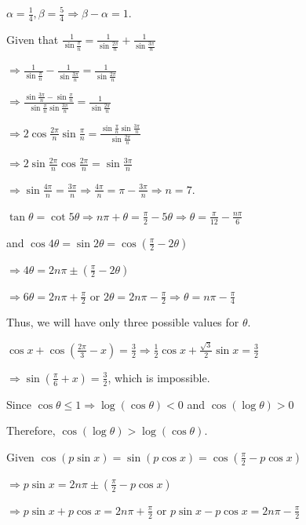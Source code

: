   $\alpha = \frac{1}{4}, \beta = \frac{5}{4}\Rightarrow \beta - \alpha = 1$.
\item Given that $\frac{1}{\sin\frac{\pi}{n}} = \frac{1}{\sin\frac{2\pi}{n}} + \frac{1}{\sin\frac{3\pi}{n}}$

  $\Rightarrow \frac{1}{\sin\frac{\pi}{n}} - \frac{1}{\sin\frac{3\pi}{n}} = \frac{1}{\sin\frac{2\pi}{n}}$

  $\Rightarrow \frac{\sin\frac{3\pi}{n} - \sin\frac{\pi}{n}}{\sin\frac{\pi}{n}\sin\frac{3\pi}{n}}
  = \frac{1}{\sin\frac{2\pi}{n}}$

  $\Rightarrow 2\cos\frac{2\pi}{n}\sin\frac{\pi}{n}
  = \frac{\sin\frac{\pi}{n}\sin\frac{3\pi}{n}}{\sin\frac{2\pi}{n}}$

  $\Rightarrow 2\sin\frac{2\pi}{n}\cos\frac{2\pi}{n} = \sin\frac{3\pi}{n}$

  $\Rightarrow \sin\frac{4\pi}{n} = \frac{3\pi}{n}\Rightarrow \frac{4\pi}{n} = \pi
  - \frac{3\pi}{n}\Rightarrow n = 7$.
\item $\tan\theta = \cot5\theta \Rightarrow n\pi + \theta = \frac{\pi}{2} - 5\theta\Rightarrow \theta
  = \frac{\pi}{12} - \frac{n\pi}{6}$

  and $\cos4\theta = \sin2\theta = \cos\left(\frac{\pi}{2} - 2\theta\right)$

  $\Rightarrow 4\theta = 2n\pi\pm\left(\frac{\pi}{2} - 2\theta\right)$

  $\Rightarrow 6\theta = 2n\pi + \frac{\pi}{2}$ or $2\theta = 2n\pi - \frac{\pi}{2}\Rightarrow \theta = n\pi
  - \frac{\pi}{4}$

  Thus, we will have only three possible values for $\theta$.
\item $\cos x + \cos\left(\frac{2\pi}{3} - x\right) = \frac{3}{2}\Rightarrow \frac{1}{2}\cos x
  + \frac{\sqrt{3}}{2}\sin x = \frac{3}{2}$

  $\Rightarrow \sin\left(\frac{\pi}{6} + x\right) = \frac{3}{2}$, which is impossible.
\item Since $\cos\theta \le 1\Rightarrow \log(\cos\theta) < 0$ and $\cos(\log\theta) > 0$

  Therefore, $\cos(\log\theta) > \log(\cos\theta)$.
\item Given $\cos(p\sin x) = \sin(p\cos x) = \cos\left(\frac{\pi}{2} - p\cos x\right)$

  $\Rightarrow p\sin x = 2n\pi \pm \left(\frac{\pi}{2} - p\cos x\right)$

  $\Rightarrow p\sin x + p\cos x = 2n\pi + \frac{\pi}{2}$ or $p\sin x - p\cos x = 2n\pi - \frac{\pi}{2}$

